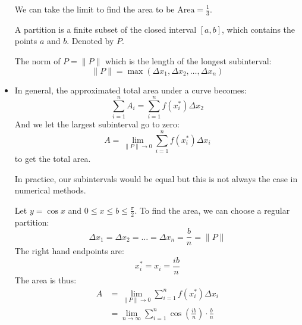 \begin{itemize}
\begin{example}
        We can take the limit to find the area to be $\text{Area}=\frac{1}{3}.$
    \end{example}
    \begin{definition}
        A partition is a finite subset of the closed interval $[a,b]$, which contains the points $a$ and $b$. Denoted by $P$.
    \end{definition}
    \begin{definition}
        The norm of $P=\lVert P \rVert$ which is the length of the longest subinterval:
        \begin{equation}
            \lVert P \rVert = \max\left(\Delta x_1, \Delta x_2, \dots , \Delta x_n\right)
        \end{equation}
    \end{definition}
    \item In general, the approximated total area under a curve becomes:
    \begin{equation}
        \sum_{i=1}^n A_i = \sum_{i=1}^n f(x_i^*)\Delta x_2
    \end{equation}
    And we let the largest subinterval go to zero:
    \begin{equation}
        A = \lim_{\lVert P \rVert \to 0} \sum_{i=1}^n f(x_i^*)\Delta x_i
        \label{eq:}
    \end{equation}
    to get the total area.
    \begin{idea}
        In practice, our subintervals would be equal but this is not always the case in numerical methods.
    \end{idea}
    \begin{example}
        Let $y=\cos x$ and $0\le x\le b\le \frac{\pi}{2}$. To find the area, we can choose a regular partition:
        \begin{equation}
            \Delta x_1= \Delta x_2 = \dots = \Delta x_n = \frac{b}{n} = \lVert P \rVert
            \label{eq:}
        \end{equation}
        The right hand endpoints are:
        \begin{equation}
            x_i^*=x_i=\frac{ib}{n}
            \label{eq:}
        \end{equation}
        The area is thus:
        \begin{align}
            A &= \lim_{\lVert P \rVert \to 0} \sum_{i=1}^n f(x_i^*)\Delta x_i \\ 
            &= \lim_{n\to \infty}\sum_{i=1}^n \cos\left(\frac{ib}{n}\right)\cdot \frac{b}{n}
            \label{eq:}
        \end{align}

\end{example}
\end{itemize}
